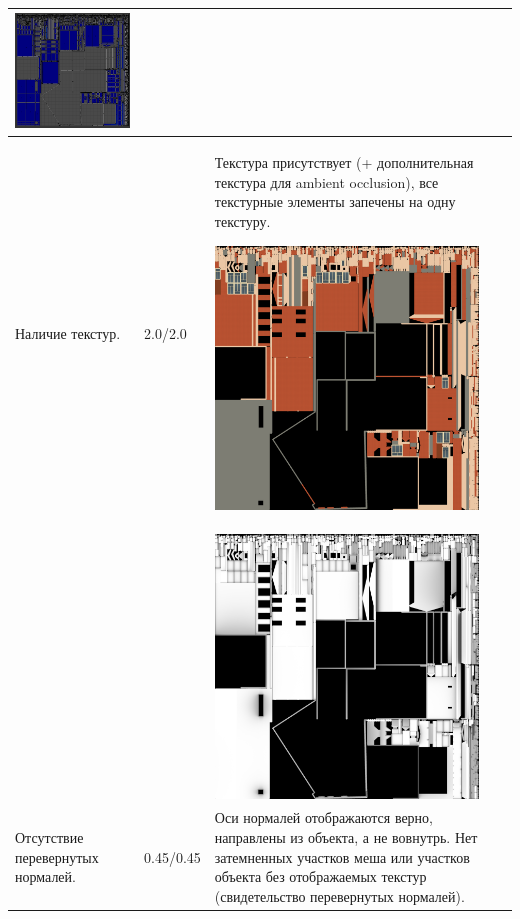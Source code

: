 \begin{longtable}{|p{4cm}|p{2.5cm}|p{7.5cm}|}
    \includegraphics[width=7cm]{src/uv_5} \\
    \hline
    Наличие текстур. & 2.0/2.0 & Текстура присутствует (+ дополнительная текстура для ambient occlusion), все текстурные элементы запечены на одну текстуру.

    \includegraphics[width=7cm]{src/tec_9}\\
    & & \includegraphics[width=7cm]{src/tec_10} \\
    \hline
    Отсутствие перевернутых нормалей. & 0.45/0.45 & Оси нормалей отображаются верно, направлены из объекта, а не вовнутрь. Нет затемненных участков меша или участков объекта без отображаемых текстур (свидетельство перевернутых нормалей).
 

\end{longtable}
